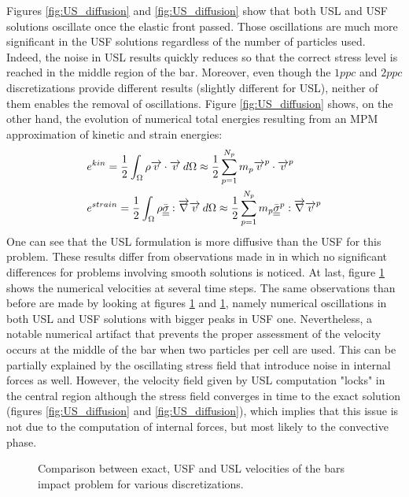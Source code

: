 Figures \ref{fig:US_diffusion} and \ref{fig:US_diffusion} show that both USL and USF solutions oscillate once the elastic front passed. Those oscillations are much more significant in the USF solutions regardless of the number of particles used. Indeed, the noise in USL results quickly reduces so that the correct stress level is reached in the middle region of the bar. Moreover, even though the $1ppc$ and $2ppc$ discretizations provide different results (slightly different for USL), neither of them enables the removal of oscillations. Figure \ref{fig:US_diffusion} shows, on the other hand, the evolution of numerical total energies resulting from an MPM approximation of kinetic and strain energies:
\begin{align}
  & e^{kin}=\frac{1}{2}\int_\Omega \rho {\overrightarrow{v}}\cdot{\overrightarrow{v}} \:d\Omega \approx \frac{1}{2}\sum_{p=1}^{N_p} m_p {\overrightarrow{v}}^p\cdot{\overrightarrow{v}}^p\\
& e^{strain}= \frac{1}{2}\int_\Omega \rho {\underline{\underline{\bar{\sigma}}}}: {\overrightarrow{\nabla}} {\overrightarrow{v}} \:d\Omega \approx \frac{1}{2}\sum_{p=1}^{N_p} m_p {\underline{\underline{\bar{\sigma}}}}^p: {\overrightarrow{\nabla}} {\overrightarrow{v}}^p
\end{align}
One can see that the USL formulation is more diffusive than the USF for this problem. These results differ from observations made in \cite{Bardenhagen_USF_USL} in which no significant differences for problems involving smooth solutions is noticed. At last, figure \ref{fig:US_velocities} shows the numerical velocities at several time steps. The same observations than before are made by looking at figures \ref{fig:US_velocities} and \ref{fig:US_velocities}, namely numerical oscillations in both USL and USF solutions with bigger peaks in USF one. Nevertheless, a notable numerical artifact that prevents the proper assessment of the velocity occurs at the middle of the bar when two particles per cell are used. This can be partially explained by the oscillating stress field that introduce noise in internal forces as well. However, the velocity field given by USL computation "locks" in the central region although the stress field converges in time to the exact solution (figures \ref{fig:US_diffusion} and \ref{fig:US_diffusion}), which implies that this issue is not due to the computation of internal forces, but most likely to the convective phase.
\begin{figure}[ht]
  \centering
  { \label{subfig:US_velo_10}}
  { \label{subfig:US_velo_25}}
  \caption{Comparison between exact, USF and USL velocities of the bars impact problem for various discretizations.}
  \label{fig:US_velocities}
\end{figure}


